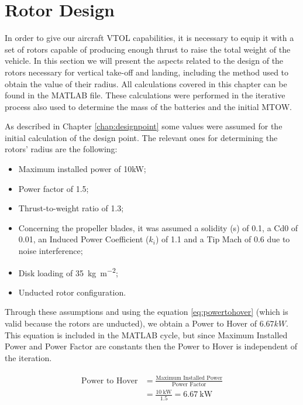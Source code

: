\documentclass[english,fira]{ist-report}
\begin{document}
\chapter{Rotor Design} \label{chap:rotordesign}
In order to give our aircraft VTOL capabilities, it is necessary to equip it with a set of rotors capable of producing enough thrust to raise the total weight of the vehicle. In this section we will present the aspects related to the design of the rotors necessary for vertical take-off and landing, including the method used to obtain the value of their radius. All calculations covered in this chapter can be found in the MATLAB file. These calculations were performed in the iterative process also used to determine the mass of the batteries and the initial MTOW. \par
As described in Chapter \ref{chap:designpoint} some values were assumed for the initial calculation of the design point. The relevant ones for determining the rotors’ radius are the following:
\begin{itemize}
    \item Maximum installed power of 10kW;
    \item Power factor of 1.5;
    \item Thrust-to-weight ratio of 1.3;
    \item Concerning the propeller blades, it was assumed a solidity (s) of 0.1, a Cd0 of 0.01, an Induced Power Coefficient ($k_i$) of 1.1 and a Tip Mach of 0.6 due to noise interference;
    \item Disk loading of \SI{35}{\kilogram\per\meter\squared};
    \item Unducted rotor configuration.
\end{itemize}
Through these assumptions and using the equation \ref{eq:powertohover} (which is valid because the rotors are unducted), we obtain a Power to Hover of $6.67kW$. This equation is included in the MATLAB cycle, but since Maximum Installed Power and Power Factor are constants then the Power to Hover is independent of the iteration.

\begin{gather}\label{eq:powertohover}
    \begin{aligned}
        \text{Power to Hover} &= \frac{\text{Maximum Installed Power}}{\text{Power Factor}} \\
        &= \frac{\SI{10}{\kilo\watt}}{1.5} = \SI{6.67}{\kilo\watt}
    \end{aligned}
\end{gather}
\end{document}
